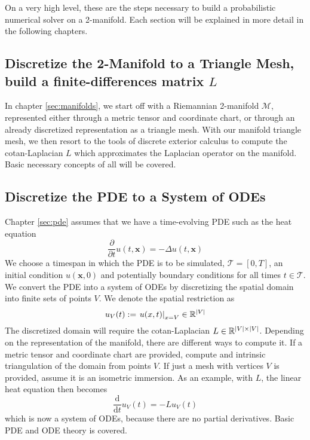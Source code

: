 \ifdefined\COMPILINGFROMMAIN
\else
    
    
\fi

On a very high level, these are the steps necessary to build a probabilistic numerical solver on a 2-manifold. Each section will be explained in more detail in the following chapters.

\subsection*{Discretize the 2-Manifold to a Triangle Mesh, build a finite-differences matrix $L$}
In chapter \ref{sec:manifolds}, we start off with a Riemannian 2-manifold $\mathcal{M}$, represented either through a metric tensor and coordinate chart, or through an already discretized representation as a triangle mesh. With our manifold triangle mesh,  we then resort to the tools of discrete exterior calculus to compute the cotan-Laplacian $L$ which approximates the Laplacian operator on the manifold. Basic necessary concepts of all will be covered.
\subsection*{Discretize the PDE to a System of ODEs}
Chapter \ref{sec:pde} assumes that we have a time-evolving PDE such as the heat equation $$\frac{\partial}{\partial t}u(t,\mathbf{x}) = -\Delta u(t,\mathbf{x})$$ We choose a timespan in which the PDE is to be simulated, $\mathcal{T} = [0, T]$, an initial condition $u(\mathbf{x}, 0)$ and potentially boundary conditions for all times $t\in \mathcal{T}$. We convert the PDE into a system of ODEs by discretizing the spatial domain into finite sets of points $V$. We denote the spatial restriction as $$u_V(t) := \left . u(x,t)\right|_{x=V} \in \mathbb{R}^{|V|}$$ The discretized domain will require the cotan-Laplacian $L \in \mathbb{R}^{|V|\times |V|}$. Depending on the representation of the manifold, there are different ways to compute it.  If a metric tensor and coordinate chart are provided, compute and intrinsic triangulation of the domain from points $V$. If just a mesh with vertices $V$ is provided, assume it is an isometric immersion. As an example, with $L$, the linear heat equation then becomes $$\frac{\text{d}}{\text{d} t}u_V(t) = -Lu_V(t)$$ which is now a system of ODEs, because there are no partial derivatives. Basic PDE and ODE theory is covered.
